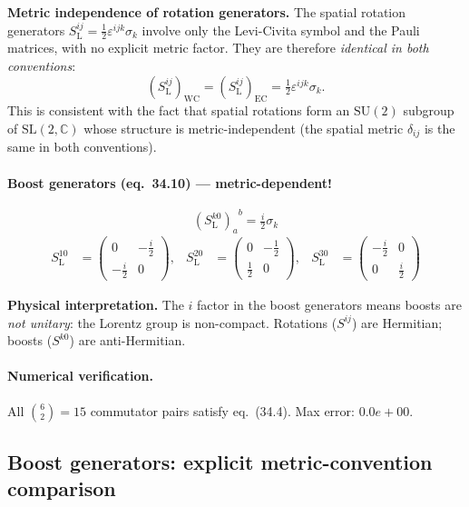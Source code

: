 \documentclass[12pt]{article}
\theoremstyle{remark}
\newcommand{\verified}[1]{\textcolor{verifygreen}{\checkmark\; #1}}
\begin{document}
\noindent\textbf{Metric independence of rotation generators.}
The spatial rotation generators $S^{ij}_{\mathrm{L}} = \tfrac{1}{2}\varepsilon^{ijk}\sigma_k$
involve only the Levi-Civita symbol and the Pauli matrices, with no explicit
metric factor. They are therefore \emph{identical in both conventions}:
\[
  (S^{ij}_{\mathrm{L}})_{\mathrm{WC}} = (S^{ij}_{\mathrm{L}})_{\mathrm{EC}}
  = \tfrac{1}{2}\varepsilon^{ijk}\sigma_k.
\]
This is consistent with the fact that spatial rotations form an $\mathrm{SU}(2)$
subgroup of $\mathrm{SL}(2,\mathbb{C})$ whose structure is
metric-independent (the spatial metric $\delta_{ij}$ is the same in both conventions).

\paragraph{Boost generators (eq.~34.10) --- metric-dependent!}
\begin{equation}
  {(S^{k0}_{\mathrm{L}})_a}^b = \tfrac{i}{2}\sigma_k
  \tag{34.10}
\end{equation}
\begin{align*}
  S^{10}_{\mathrm{L}} &= \begin{pmatrix}0 & -\tfrac{i}{2} \\ -\tfrac{i}{2} & 0\end{pmatrix},&
  S^{20}_{\mathrm{L}} &= \begin{pmatrix}0 & -\tfrac{1}{2} \\ \tfrac{1}{2} & 0\end{pmatrix},&
  S^{30}_{\mathrm{L}} &= \begin{pmatrix}-\tfrac{i}{2} & 0 \\ 0 & \tfrac{i}{2}\end{pmatrix}
\end{align*}

\noindent\textbf{Physical interpretation.}
The $i$ factor in the boost generators means boosts are \emph{not unitary}:
the Lorentz group is non-compact.  Rotations ($S^{ij}$) are Hermitian;
boosts ($S^{k0}$) are anti-Hermitian.

\paragraph{Numerical verification.}
\verified{All $\binom{6}{2} = 15$ commutator pairs satisfy eq.~(34.4). Max error: $0.0e+00$.}

\subsection{Boost generators: explicit metric-convention comparison}
\end{document}

